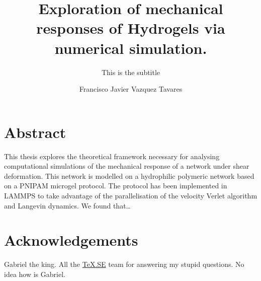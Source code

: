 \documentclass[12pt,colorful,boxey]{tufte-style-thesis}
\author{Francisco Javier Vazquez Tavares}
\title{Exploration of mechanical responses of Hydrogels via numerical simulation.}
\subtitle{This is the subtitle}
\begin{document}
\maketitle

\justifying

\chapter*{Abstract}
This thesis explores the theoretical framework necessary for analysing computational simulations of the mechanical response of a network under shear deformation.
This network is modelled on a hydrophilic polymeric network based on a PNIPAM microgel protocol.
The protocol has been implemented in LAMMPS to take advantage of the parallelisation of the velocity Verlet algorithm and Langevin dynamics.
We found that\ldots


\chapter*{Acknowledgements}
Gabriel the king. 
All the \href{https://tex.stackexchange.com/}{\TeX.SE} team for answering my stupid questions.
No idea how is Gabriel.

\tableofcontents
\listoffigures
\listoftables
\listoflistings


\mainmatter



\end{document}
